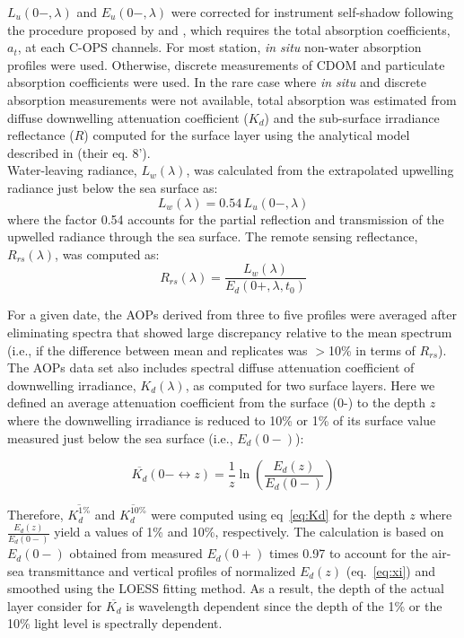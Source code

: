 \documentclass[essd, manuscript]{copernicus}
\begin{document}
$L_u(0-,\lambda)$ and $E_u(0-,\lambda)$ were corrected for instrument self-shadow following the procedure proposed by \citet{Gordon1992b} and \citet{Zibordi1995}, which requires the total absorption coefficients, $a_t$, at each C-OPS channels. For most station, \textit{in situ} non-water absorption profiles were used. Otherwise, discrete measurements of CDOM and particulate absorption coefficients were used. In the rare case where \textit{in situ} and discrete absorption measurements were not available, total absorption was estimated from diffuse downwelling attenuation coefficient ($K_d$) and the sub-surface irradiance reflectance ($R$) computed for the surface layer using the analytical model described in \citet{Morel2001} (their eq. 8').\\ 
Water-leaving radiance, $L_w(\lambda)$, was calculated from the extrapolated upwelling radiance just below the sea surface as:
 \begin{equation}
 \label{eq:L_w}
L_w(\lambda) = 0.54\,L_u(0-,\lambda)
\end{equation}
where the factor 0.54 accounts for the partial reflection and transmission of the upwelled radiance through the sea surface. 
The remote sensing reflectance, $R_{rs}(\lambda)$, was computed as:
 \begin{equation}
 \label{eq:Rrs}
R_{rs}(\lambda) = \frac{L_w(\lambda)}{E_d(0+,\lambda,t_0)} 
\end{equation}

For a given date, the AOPs derived from three to five profiles were averaged after eliminating spectra that showed large discrepancy relative to the mean spectrum (i.e., if the difference between mean and replicates was $>$10\% in terms of $R_{rs}$).\\  

The AOPs data set also includes spectral diffuse attenuation coefficient of downwelling irradiance, $K_d(\lambda)$, as computed for two surface layers. Here we defined an average attenuation coefficient from the surface (0-) to the depth $z$ where the downwelling irradiance is reduced to 10\% or 1\% of its surface value measured just below the sea surface (i.e., $E_d(0-)$):  

\begin{equation}
    \overline{K_d}(0- \leftrightarrow z) = \frac{1}{z}\ln \left( \frac{E_d(z)}{E_d(0-)} \right)
    \label{eq:Kd}
\end{equation}

Therefore, $\overline{K_d^{1\%}}$ and $\overline{K_d^{10\%}}$ were computed using eq~\ref{eq:Kd} for the depth $z$ where $\frac{E_d(z)}{E_d(0-)}$ yield a values of 1\% and 10\%, respectively. The calculation is based on $E_d(0-)$ obtained from measured $E_d(0+)$ times 0.97 to account for the air-sea transmittance \citep{Mueller2003vIII} and vertical profiles of normalized $E_d(z)$ (eq.~\ref{eq:xi}) and smoothed using the LOESS fitting method. As a result, the depth of the actual layer consider for $\overline{K_d}$ is wavelength dependent since the depth of the 1\% or the 10\% light level is spectrally dependent. \\ 
\end{document}
